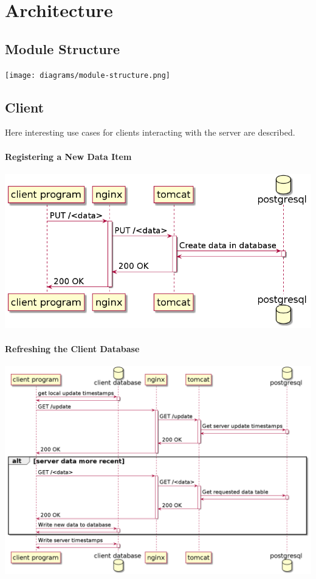 \documentclass{memoir}
\begin{document}
\section{Architecture}

\subsection{Module Structure}

\texttt{[image: diagrams/module-structure.png]}

\subsection{Client}

Here interesting use cases for clients interacting with the server are described.

\paragraph{Registering a New Data Item\\}

\includegraphics[width=\linewidth]{diagrams/put-data.png}

\paragraph{Refreshing the Client Database\\}

\includegraphics[width=\linewidth]{diagrams/refresh-data.png}
\end{document}
